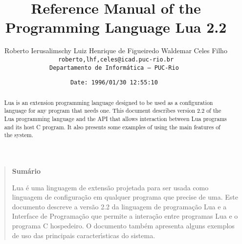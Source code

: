 

\newcommand{\rw}[1]{{\bf #1}}
\newcommand{\see}[1]{see Section~\ref{#1}}
\newcommand{\nil}{{\bf nil}}
\newcommand{\Line}{\rule{\linewidth}{.5mm}}
\def\tecgraf{{\sf TeC\kern-.21em\lower.7ex\hbox{Graf}}}

\newcommand{\Index}[1]{#1\index{#1}}
\newcommand{\IndexVerb}[1]{{\tt #1}\index{#1}}
\newcommand{\Def}[1]{{\em #1}\index{#1}}
\newcommand{\Deffunc}[1]{\index{{\tt #1}}}




\title{Reference Manual of the Programming Language Lua 2.2}

\author{%
Roberto Ierusalimschy\quad
Luiz Henrique de Figueiredo\quad
Waldemar Celes Filho
\vspace{1.0ex}\\
\smallskip
\small\tt roberto,lhf,celes@icad.puc-rio.br
\vspace{2.0ex}\\
Departamento de Inform\'atica --- PUC-Rio
}

\date{\small \verb$Date: 1996/01/30 12:55:10 $}

\maketitle


\begin{abstract}
\noindent
Lua is an extension programming language designed to be used
as a configuration language for any program that needs one.
This document describes version 2.2 of the Lua programming language and the
API that allows interaction between Lua programs and its host C program.
It also presents some examples of using the main features of the system.
\end{abstract}

\vspace{4ex}
\begin{quotation}
\small
\begin{center}{\bf Sum\'ario}\end{center}
\vspace{1ex}
\noindent
Lua \'e uma linguagem de extens\~ao projetada para ser usada como
linguagem de configura\c{c}\~ao em qualquer programa que precise de
uma.
Este documento descreve a vers\~ao 2.2 da linguagem de programa\c{c}\~ao Lua e a
Interface de Programa\c{c}\~ao que permite a intera\c{c}\~ao entre programas Lua
e o programa C hospedeiro.
O documento tamb\'em apresenta alguns exemplos de uso das principais
ca\-racte\-r\'{\i}sticas do sistema.
\end{quotation}


